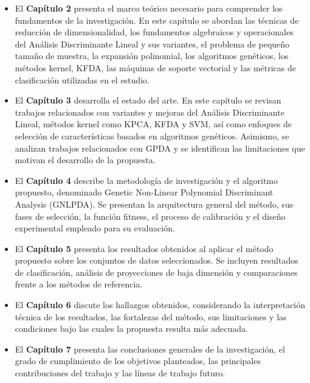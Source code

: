 \begin{itemize}
	
	\item El \textbf{Capítulo 2} presenta el marco teórico necesario para comprender los fundamentos de la investigación. En este capítulo se abordan las técnicas de reducción de dimensionalidad, los fundamentos algebraicos y operacionales del Análisis Discriminante Lineal y sus variantes, el problema de pequeño tamaño de muestra, la expansión polinomial, los algoritmos genéticos, los métodos kernel, KFDA, las máquinas de soporte vectorial y las métricas de clasificación utilizadas en el estudio.
	
	\item El \textbf{Capítulo 3} desarrolla el estado del arte. En este capítulo se revisan trabajos relacionados con variantes y mejoras del Análisis Discriminante Lineal, métodos kernel como KPCA, KFDA y SVM, así como enfoques de selección de características basados en algoritmos genéticos. Asimismo, se analizan trabajos relacionados con GPDA y se identifican las limitaciones que motivan el desarrollo de la propuesta.
	
	\item El \textbf{Capítulo 4} describe la metodología de investigación y el algoritmo propuesto, denominado Genetic Non-Linear Polynomial Discriminant Analysis (GNLPDA). Se presentan la arquitectura general del método, sus fases de selección, la función fitness, el proceso de calibración y el diseño experimental empleado para su evaluación.
	
	\item El \textbf{Capítulo 5} presenta los resultados obtenidos al aplicar el método propuesto sobre los conjuntos de datos seleccionados. Se incluyen resultados de clasificación, análisis de proyecciones de baja dimensión y comparaciones frente a los métodos de referencia.
	
	\item El \textbf{Capítulo 6} discute los hallazgos obtenidos, considerando la interpretación técnica de los resultados, las fortalezas del método, sus limitaciones y las condiciones bajo las cuales la propuesta resulta más adecuada.
	
	\item El \textbf{Capítulo 7} presenta las conclusiones generales de la investigación, el grado de cumplimiento de los objetivos planteados, las principales contribuciones del trabajo y las líneas de trabajo futuro.
	
\end{itemize}




